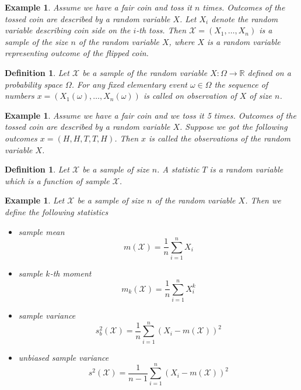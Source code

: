 \documentclass[12pt]{article}
\newtheorem{definition}[theorem]{Definition}
\newtheorem{example}[theorem]{Example}
\begin{document}
\begin{example} Assume we have a fair coin and toss it $n$ times. Outcomes of
    the tossed coin are described by a random variable $X$. Let $X_i$ denote the
    random variable describing coin side on the $i$-th toss. Then
    $\mathscr{X}=(X_1,\ldots,X_n)$ is a sample of the size $n$ of the random
    variable $X$, where $X$ is a random variable representing outcome of the
    flipped coin.
\end{example}

\begin{definition} Let $\mathscr{X}$ be a sample of the random variable
    $X:\Omega\to\mathbb{R}$ defined on a probability space $\Omega$. For any
    fixed elementary event $\omega\in\Omega$ the sequence of numbers
    $x=(X_1(\omega),\ldots,X_n(\omega))$ is called on observation of $X$ of size
    $n$.
\end{definition}

\begin{example} Assume we have a fair coin and we toss it 5 times. Outcomes of
    the tossed coin are described by a random variable $X$. Suppose we got the
    following outcomes $x=(H,H,T,T,H)$. Then $x$ is called the observations of
    the random variable $X$.
\end{example}

\begin{definition} Let $\mathscr{X}$ be a sample of size $n$. A statistic $T$ is
    a random variable which is a function of sample $\mathscr{X}$.
\end{definition}

\begin{example} Let $\mathscr{X}$ be a sample of size $n$ of the random variable
    $X$. Then we define the following statistics
    \begin{itemize}
        \item sample mean $$m(\mathscr{X})=\frac{1}{n}\sum_{i=1}^n X_i$$
        \item sample $k$-th moment $$m_{k}(\mathscr{X})=\frac{1}{n}\sum_{i=1}^n
                  X_i^k$$
        \item sample variance
              $$
                  s_b^2(\mathscr{X})
                  =\frac{1}{n}\sum_{i=1}^n{(X_i-m(\mathscr{X}))}^2
              $$
        \item unbiased sample variance
              $$
                  s^2(\mathscr{X})
                  =\frac{1}{n-1}\sum_{i=1}^n{(X_i-m(\mathscr{X}))}^2
              $$
    \end{itemize}
\end{example}
\end{document}
